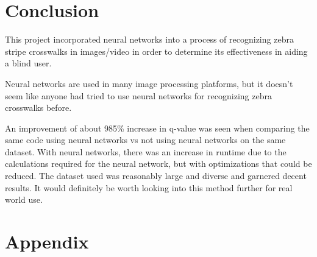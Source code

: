 \documentclass[12pt]{ucthesis}
\begin{document}
\chapter{Conclusion}
\label{conclusion}

This project incorporated neural networks into a process of recognizing zebra stripe crosswalks in images/video in order to determine its effectiveness in aiding a blind user. 

Neural networks are used in many image processing platforms, but it doesn't seem like anyone had tried to use neural networks for recognizing zebra crosswalks before.

An improvement of about 985\% increase in q-value was seen when comparing the same code using neural networks vs not using neural networks on the same dataset. With neural networks, there was an increase in runtime due to the calculations required for the neural network, but with optimizations that could be reduced. The dataset used was reasonably large and diverse and garnered decent results. It would definitely be worth looking into this method further for real world use. 








\clearpage



\chapter{Appendix}
\end{document}
